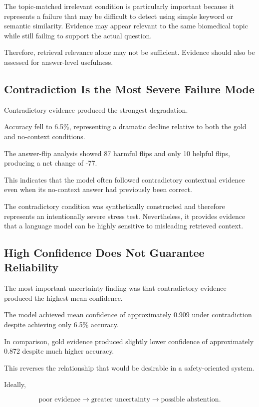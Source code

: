 \documentclass[conference]{IEEEtran}
\begin{document}
The topic-matched irrelevant condition is particularly important because it represents a failure that may be difficult to detect using simple keyword or semantic similarity. Evidence may appear relevant to the same biomedical topic while still failing to support the actual question.

Therefore, retrieval relevance alone may not be sufficient. Evidence should also be assessed for answer-level usefulness.

\subsection{Contradiction Is the Most Severe Failure Mode}

Contradictory evidence produced the strongest degradation.

Accuracy fell to 6.5\%, representing a dramatic decline relative to both the gold and no-context conditions.

The answer-flip analysis showed 87 harmful flips and only 10 helpful flips, producing a net change of -77.

This indicates that the model often followed contradictory contextual evidence even when its no-context answer had previously been correct.

The contradictory condition was synthetically constructed and therefore represents an intentionally severe stress test. Nevertheless, it provides evidence that a language model can be highly sensitive to misleading retrieved context.

\subsection{High Confidence Does Not Guarantee Reliability}

The most important uncertainty finding was that contradictory evidence produced the highest mean confidence.

The model achieved mean confidence of approximately 0.909 under contradiction despite achieving only 6.5\% accuracy.

In comparison, gold evidence produced slightly lower confidence of approximately 0.872 despite much higher accuracy.

This reverses the relationship that would be desirable in a safety-oriented system.

Ideally,

\begin{equation}
\text{poor evidence}
\rightarrow
\text{greater uncertainty}
\rightarrow
\text{possible abstention}.
\end{equation}
\end{document}
